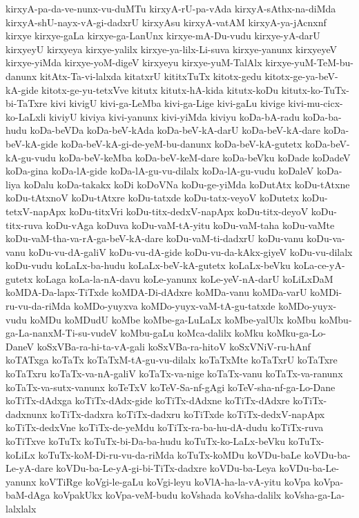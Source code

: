 {kirxyA-pa-da-ve-nunx-vu-duMTu
kirxyA-rU-pa-vAda
kirxyA-sAthx-na-diMda
kirxyA-shU-nayx-vA-gi-dadxrU
kirxyAsu
kirxyA-vatAM
kirxyA-ya-jAcnxnf
kirxye
kirxye-gaLa
kirxye-ga-LanUnx
kirxye-mA-Du-vudu
kirxye-yA-darU
kirxyeyU
kirxyeya
kirxye-yalilx
kirxye-ya-lilx-Li-suva
kirxye-yanunx
kirxyeyeV
kirxye-yiMda
kirxye-yoM-digeV
kirxyeyu
kirxye-yuM-TalAlx
kirxye-yuM-TeM-bu-danunx
kitAtx-Ta-vi-lalxda
kitatxrU
kititxTuTx
kitotx-gedu
kitotx-ge-ya-beV-kA-gide
kitotx-ge-yu-tetxVve
kitutx
kitutx-hA-kida
kitutx-koDu
kitutx-ko-TuTx-bi-TaTxre
kivi
kivigU
kivi-ga-LeMba
kivi-ga-Lige
kivi-gaLu
kivige
kivi-mu-cicx-ko-LaLxli
kiviyU
kiviya
kivi-yanunx
kivi-yiMda
kiviyu
koDa-bA-radu
koDa-ba-hudu
koDa-beVDa
koDa-beV-kAda
koDa-beV-kA-darU
koDa-beV-kA-dare
koDa-beV-kA-gide
koDa-beV-kA-gi-de-yeM-bu-danunx
koDa-beV-kA-gutetx
koDa-beV-kA-gu-vudu
koDa-beV-keMba
koDa-beV-keM-dare
koDa-beVku
koDade
koDadeV
koDa-gina
koDa-lA-gide
koDa-lA-gu-vu-dilalx
koDa-lA-gu-vudu
koDaleV
koDa-liya
koDalu
koDa-takakx
koDi
koDoVNa
koDu-ge-yiMda
koDutAtx
koDu-tAtxne
koDu-tAtxnoV
koDu-tAtxre
koDu-tatxde
koDu-tatx-veyoV
koDutetx
koDu-tetxV-napApx
koDu-titxVri
koDu-titx-dedxV-napApx
koDu-titx-deyoV
koDu-titx-ruva
koDu-vAga
koDuva
koDu-vaM-tA-yitu
koDu-vaM-taha
koDu-vaMte
koDu-vaM-tha-va-rA-ga-beV-kA-dare
koDu-vaM-ti-dadxrU
koDu-vanu
koDu-va-vanu
koDu-vu-dA-galiV
koDu-vu-dA-gide
koDu-vu-da-kAkx-giyeV
koDu-vu-dilalx
koDu-vudu
koLaLx-ba-hudu
koLaLx-beV-kA-gutetx
koLaLx-beVku
koLa-ce-yA-gutetx
koLaga
koLa-la-nA-davu
koLe-yanunx
koLe-yeV-nA-darU
koLiLxDaM
koMDA-Da-lapx-TiTxde
koMDA-Di-dAdxre
koMDa-vanu
koMDa-varU
koMDi-ru-vu-da-riMda
koMDo-yuyxva
koMDo-yuyx-vaM-tA-gu-tatxde
koMDo-yuyx-vudu
koMDu
koMDudU
koMbe
koMbe-ga-LuLaLx
koMbe-yalUlx
koMbu
koMbu-ga-La-nanxM-Ti-su-vudeV
koMbu-gaLu
koMca-dalilx
koMku
koMku-ga-Lo-DaneV
koSxVBa-ra-hi-ta-vA-gali
koSxVBa-ra-hitoV
koSxVNiV-ru-hAnf
koTATxga
koTaTx
koTaTxM-tA-gu-vu-dilalx
koTaTxMte
koTaTxrU
koTaTxre
koTaTxru
koTaTx-va-nA-galiV
koTaTx-va-nige
koTaTx-vanu
koTaTx-va-ranunx
koTaTx-va-sutx-vanunx
koTeTxV
koTeV-Sa-nf-gAgi
koTeV-sha-nf-ga-Lo-Dane
koTiTx-dAdxga
koTiTx-dAdx-gide
koTiTx-dAdxne
koTiTx-dAdxre
koTiTx-dadxnunx
koTiTx-dadxra
koTiTx-dadxru
koTiTxde
koTiTx-dedxV-napApx
koTiTx-dedxVne
koTiTx-de-yeMdu
koTiTx-ra-ba-hu-dA-dudu
koTiTx-ruva
koTiTxve
koTuTx
koTuTx-bi-Da-ba-hudu
koTuTx-ko-LaLx-beVku
koTuTx-koLiLx
koTuTx-koM-Di-ru-vu-da-riMda
koTuTx-koMDu
koVDu-baLe
koVDu-ba-Le-yA-dare
koVDu-ba-Le-yA-gi-bi-TiTx-dadxre
koVDu-ba-Leya
koVDu-ba-Le-yanunx
koVTiRge
koVgi-le-gaLu
koVgi-leyu
koVlA-ha-la-vA-yitu
koVpa
koVpa-baM-dAga
koVpakUkx
koVpa-veM-budu
koVshada
koVsha-dalilx
koVsha-ga-La-lalxlalx
}
